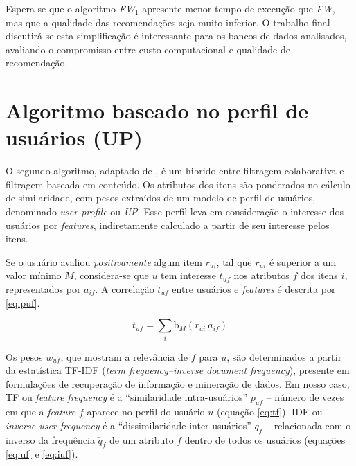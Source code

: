 Espera-se que o algoritmo \textit{FW$_1$} apresente menor tempo de execução que \textit{FW}, mas que a qualidade das recomendações seja muito inferior. O trabalho final discutirá se esta simplificação é interessante para os bancos de dados analisados, avaliando o compromisso entre custo computacional e qualidade de recomendação.


\section{Algoritmo baseado no perfil de usuários (UP)} %
\label{sec:algoritmo_baseado_no_perfil_de_usu_rios_}


O segundo algoritmo, adaptado de \cite{debnath2008feature}, é um hibrido entre filtragem colaborativa e filtragem baseada em conteúdo. Os atributos dos itens são ponderados no cálculo de similaridade, com pesos extraídos de um modelo de perfil de usuários, denominado \textit{user profile} ou \textit{UP}. Esse perfil leva em consideração o interesse dos usuários por \textit{features}, indiretamente calculado a partir de seu interesse pelos itens. 

Se o usuário avaliou \textit{positivamente} algum item $r_{ui}$, tal que $r_{ui}$ é superior a um valor mínimo $M$, considera-se que $u$ tem interesse $t_{uf}$ nos atributos $f$ dos itens $i$, representados por $a_{if}$. A correlação $t_{uf}$ entre usuários e \textit{features} é descrita por \ref{eq:puf}.

\begin{equation}
\label{eq:puf} 
    t_{uf} = \sum_{i}{\mathrm{b}_M\left(r_{ui}~a_{if}\right)} 
\end{equation} 

Os pesos $w_{uf}$, que mostram a relevância de $f$ para $u$, são determinados a partir da estatística TF-IDF (\textit{term frequency--inverse document frequency}), presente em formulações de recuperação de informação e mineração de dados. Em nosso caso, TF ou \textit{feature frequency} é a ``similaridade intra-usuários'' $p_{uf}$ -- número de vezes em que a \textit{feature} $f$ aparece no perfil do usuário $u$ (equação \ref{eq:tf}). IDF ou \textit{inverse user frequency} é a ``dissimilaridade inter-usuários'' $q_{f}$ -- relacionada com o inverso da frequência $\check{q}_{f}$ de um atributo $f$ dentro de todos os usuários (equações \ref{eq:uf} e \ref{eq:iuf}).

